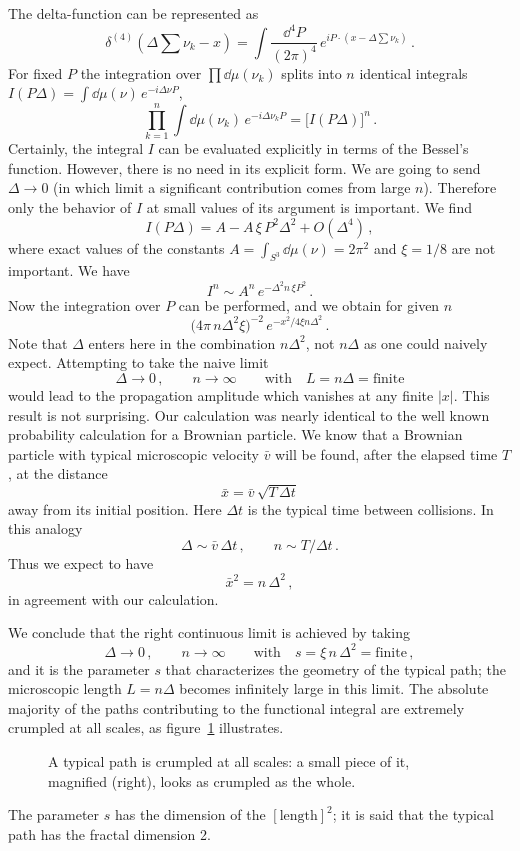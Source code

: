 The delta-function can be represented as
\[
\delta^{(4)}\left(\Delta\sum\nu_k-x\right)=\int\frac{\dd^4P}{(2\pi)^4}\,e^{iP\cdot(x-\Delta\sum\nu_k)}\,.
\]
For fixed $P$ the integration over $\prod \dd\mu(\nu_k)$ splits into $n$
identical integrals $I(P\Delta)=\int \dd\mu(\nu)\,e^{-i\Delta\nu P}$,
\[
\prod_{k=1}^n\int \dd\mu(\nu_k)\,e^{-i\Delta\nu_kP}=\bigl[I(P\Delta)\bigr]^n\,.
\]
Certainly, the integral $I$ can be evaluated explicitly in terms of the
Bessel's function. However, there is no need in its explicit form. We are
going to send $\Delta\to0$ (in which limit a significant contribution comes
from large $n$). Therefore only the behavior of $I$ at small values of its
argument is important. We find
\[
I(P\Delta)=A-A\,\xi\,P^2\Delta^2+O(\Delta^4)\,,
\]
where exact values of the constants $A=\int_{S^3}\dd\mu(\nu)=2\pi^2$ and
$\xi=1/8$ are not important. We have
\[
I^n\sim A^n\,e^{-\Delta^2n\,\xi P^2}\,.
\]
Now the integration over $P$ can be performed, and we obtain for given $n$
\[
\bigl(4\pi\,n\Delta^2\xi\bigr)^{-2}\,e^{-x^2/4\xi n\Delta^2}\,.
\]
Note that $\Delta$ enters here in the combination $n\Delta^2$, not $n\Delta$
as one could naively expect. Attempting to take the naive limit
\[
\Delta\to0\,,\qquad n\to\infty\qquad\text{with}\quad L=n\Delta=\text{finite}
\]
would lead to the propagation amplitude which vanishes at any finite $|x|$.
This result is not surprising. Our calculation was nearly identical to the
well known probability calculation for a Brownian particle. We know that a
Brownian particle with typical microscopic velocity $\bar v$ will be found,
after the elapsed time $T$, at the distance
\[
\bar x=\bar v\,\sqrt{T\,\Delta t}
\]
away from its initial position. Here $\Delta t$ is the typical time between
collisions. In this analogy
\[
\Delta\sim\bar v\,\Delta t\,,\qquad n\sim T/\Delta t\,.
\]
Thus we expect to have
\[
\bar x^2=n\,\Delta^2\,,
\]
in agreement with our calculation.

We conclude that the right continuous limit is achieved by taking
\[
\Delta\to0\,,\qquad n\to\infty\qquad\text{with}\quad s=\xi\,n\,\Delta^2=\text{finite}\,,
\]
and it is the parameter $s$ that characterizes the geometry of the typical
path; the microscopic length $L=n\Delta$ becomes infinitely large in this
limit. The absolute majority of the paths contributing to the functional
integral are extremely crumpled at all scales, as figure~\ref{fig:crumpled}
illustrates.
\begin{figure}[ht]
\centering{}
\caption{A typical path is crumpled at all scales: a small piece of it,
magnified (right), looks as crumpled as the whole.}
\label{fig:crumpled}
\end{figure}
The parameter $s$ has the dimension of the $[\text{length}]^2$; it is said that
the typical path has the fractal dimension 2.

